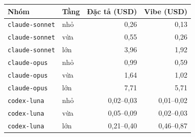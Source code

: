 \begin{tabular}{llrr}
\toprule
Nhóm & Tầng & Đặc tả (USD) & Vibe (USD) \\
\midrule
\texttt{claude-sonnet} & nhỏ & 0,26 & 0,13 \\
\texttt{claude-sonnet} & vừa & 0,55 & 0,26 \\
\texttt{claude-sonnet} & lớn & 3,96 & 1,92 \\
\texttt{claude-opus} & nhỏ & 0,99 & 0,59 \\
\texttt{claude-opus} & vừa & 1,64 & 1,02 \\
\texttt{claude-opus} & lớn & 7,71 & 5,71 \\
\texttt{codex-luna} & nhỏ & 0,02--0,03 & 0,01--0,02 \\
\texttt{codex-luna} & vừa & 0,05--0,09 & 0,02--0,03 \\
\texttt{codex-luna} & lớn & 0,21--0,40 & 0,46--0,87 \\
\bottomrule
\end{tabular}
